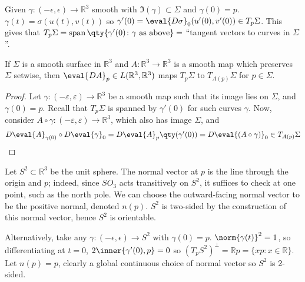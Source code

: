 \begin{remark}
	Given $\gamma : (-\epsilon, \epsilon) \to \mathbb{R}^3$ smooth with $\Im(\gamma) \subset \Sigma$ and $\gamma(0) = p$.
	$\gamma(t) = \sigma(u(t), v(t))$ so $\gamma'(0) = \eval{D \sigma}_0(u'(0), v'(0)) \in T_p \Sigma$.
	This gives that $T_p \Sigma = \vecspan \qty{ \gamma'(0) \colon \gamma \text{ as above} } =$ ``tangent vectors to curves in $\Sigma$''.
\end{remark} 

\begin{lemma}
	If $\Sigma$ is a smooth surface in $\mathbb R^3$ and $A \colon \mathbb R^3 \to \mathbb R^3$ is a smooth map which preserves $\Sigma$ setwise, then $\eval{DA}_p \in L(\mathbb R^3, \mathbb R^3)$ maps $T_p \Sigma$ to $T_{A(p)} \Sigma$ for $p \in \Sigma$.
\end{lemma}

\begin{proof}
	Let $\gamma \colon (-\varepsilon, \varepsilon) \to \mathbb R^3$ be a smooth map such that its image lies on $\Sigma$, and $\gamma(0) = p$.
	Recall that $T_p \Sigma$ is spanned by $\gamma'(0)$ for such curves $\gamma$.
	Now, consider $A \circ \gamma \colon (-\varepsilon, \varepsilon) \to \mathbb R^3$, which also has image $\Sigma$, and
	\begin{align*}
		D \eval{A}_{\gamma(0)} \circ D \eval{\gamma}_0 = D \eval{A}_p \qty(\gamma'(0)) = D \eval{(A \circ \gamma)}_0 \in T_{A(p)} \Sigma
	\end{align*}
\end{proof}

\begin{example}
	Let $S^2 \subset \mathbb{R}^3$ be the unit sphere.
	The normal vector at $p$ is the line through the origin and $p$; indeed, since $SO_3$ acts transitively on $S^2$, it suffices to check at one point, such as the north pole.
	We can choose the outward-facing normal vector to be the positive normal, denoted $n(p)$.
	$S^2$ is two-sided by the construction of this normal vector, hence $S^2$ is orientable.

	Alternatively, take any $\gamma : (-\epsilon, \epsilon) \to S^2$ with $\gamma(0) = p$.
	$\norm{\gamma(t)}^2 = 1$, so differentiating at $t = 0$, $2 \inner{\gamma'(0), p} = 0$ so $(T_p S^2)^\perp = \mathbb{R} p = \{xp: x \in \mathbb{R}\}$.
	Let $n(p) = p$, clearly a global continuous choice of normal vector so $S^2$ is 2-sided.
\end{example}

